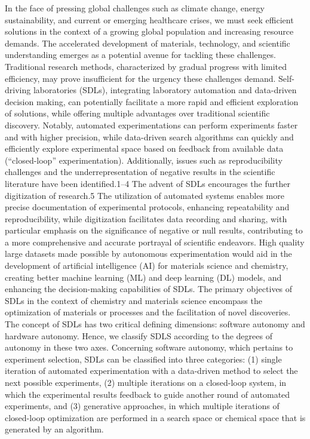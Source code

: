 \documentclass{article}
\begin{document}
In the face of pressing global challenges such as climate change, energy sustainability, and current or emerging healthcare crises, we must seek efficient solutions in the context of a growing global population and increasing resource demands. The accelerated development of materials, technology, and scientific understanding emerges as a potential avenue for tackling these challenges. Traditional research methods, characterized by gradual progress with limited efficiency, may prove insufficient for the urgency these challenges demand. Self-driving laboratories (SDLs), integrating laboratory automation and data-driven decision making, can potentially facilitate a more rapid and efficient exploration of solutions, while offering multiple advantages over traditional scientific discovery. Notably, automated experimentations can perform experiments faster and with higher precision, while data-driven search algorithms can quickly and efficiently explore experimental space based on feedback from available data (“closed-loop” experimentation). Additionally, issues such as reproducibility challenges and the underrepresentation of negative results in the scientific literature have been identified.1–4 The advent of SDLs encourages the further digitization of research.5 The utilization of automated systems enables more precise documentation of experimental protocols, enhancing repeatability and reproducibility, while digitization facilitates data recording and sharing, with particular emphasis on the significance of negative or null results, contributing to a more comprehensive and accurate portrayal of scientific endeavors. High quality large datasets made possible by autonomous experimentation would aid in the development of artificial intelligence (AI) for materials science and chemistry, creating better machine learning (ML) and deep learning (DL) models, and enhancing the decision-making capabilities of SDLs.
The primary objectives of SDLs in the context of chemistry and materials science encompass the optimization of materials or processes and the facilitation of novel discoveries. The concept of SDLs has two critical defining dimensions: software autonomy and hardware autonomy. Hence, we classify SDLS according to the degrees of autonomy in these two axes.
Concerning software autonomy, which pertains to experiment selection, SDLs can be classified into three categories: (1) single iteration of automated experimentation with a data-driven method to select the next possible experiments, (2) multiple iterations on a closed-loop system, in which the experimental results feedback to guide another round of automated experiments, and (3) generative approaches, in which multiple iterations of closed-loop optimization are performed in a search space or chemical space that is generated by an algorithm.
\end{document}
